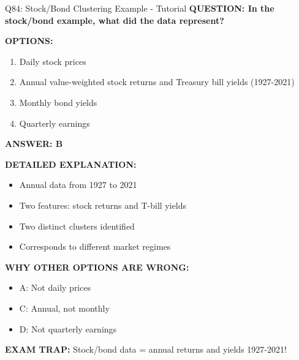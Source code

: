 \documentclass[8pt]{beamer}
\begin{document}
	\begin{frame}{Q84: Stock/Bond Clustering Example - Tutorial}
		\fontsize{6.5}{7.5}\selectfont
		\textbf{QUESTION: In the stock/bond example, what did the data represent?}
		
		\vspace{0.1cm}
		\textbf{OPTIONS:}
		\begin{enumerate}
			\item Daily stock prices
			\item Annual value-weighted stock returns and Treasury bill yields (1927-2021)
			\item Monthly bond yields
			\item Quarterly earnings
		\end{enumerate}
		
		\vspace{0.1cm}
		\textcolor{myblue}{\textbf{ANSWER: B}}
		
		\vspace{0.1cm}
		\textbf{DETAILED EXPLANATION:}
		\begin{itemize}
			\item Annual data from 1927 to 2021
			\item Two features: stock returns and T-bill yields
			\item Two distinct clusters identified
			\item Corresponds to different market regimes
		\end{itemize}
		
		\vspace{0.1cm}
		\textcolor{myred}{\textbf{WHY OTHER OPTIONS ARE WRONG:}}
		\begin{itemize}
			\item \textcolor{myred}{A:} Not daily prices
			\item \textcolor{myred}{C:} Annual, not monthly
			\item \textcolor{myred}{D:} Not quarterly earnings
		\end{itemize}
		
		\textcolor{myred}{\textbf{EXAM TRAP:}} Stock/bond data = \textcolor{myblue}{annual returns and yields 1927-2021}!
	\end{frame}
	
\end{document}

